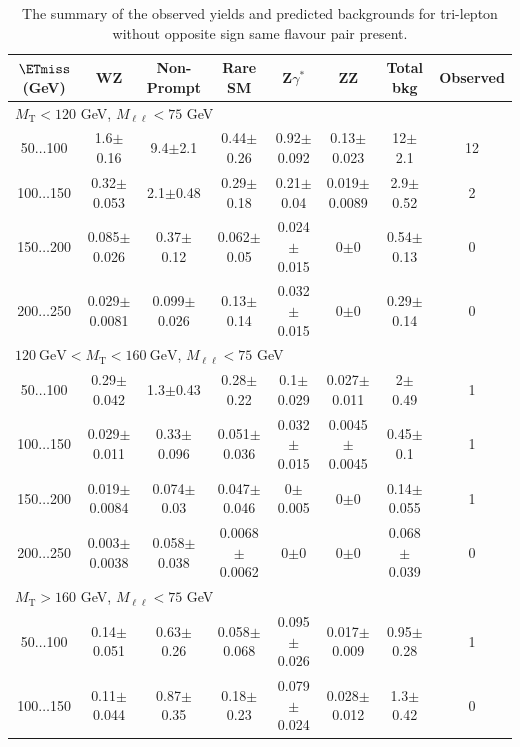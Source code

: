 \begin{landscape}
\begin{table}
\begin{center}
\begin{tabular}{| c | c c c c c c c | }
\hline\hline
\end{tabular}
\end{center}
\end{table}
\begin{table}
\small
\begin{center}
\caption{\label{tab:OSSF0tau0} The summary of the observed yields and predicted backgrounds for tri-lepton without opposite sign same flavour pair present. }
\begin{tabular}{| c | c c c c c c c | }\hline\hline
$\ETmiss$ (GeV) & WZ & Non-Prompt & Rare SM & Z$\gamma^*$ & ZZ & Total bkg & Observed\\\hline\hline
\multicolumn{7}{l}{$M_{\text{T}} < 120$ GeV, $M_{\ell\ell} < 75$ GeV}\\\hline\hline
50$\dots$100&1.6$\pm$0.16&9.4$\pm$2.1&0.44$\pm$0.26&0.92$\pm$0.092&0.13$\pm$0.023&12$\pm$2.1&12\\
100$\dots$150&0.32$\pm$0.053&2.1$\pm$0.48&0.29$\pm$0.18&0.21$\pm$0.04&0.019$\pm$0.0089&2.9$\pm$0.52&2\\
150$\dots$200&0.085$\pm$0.026&0.37$\pm$0.12&0.062$\pm$0.05&0.024$\pm$0.015&0$\pm$0&0.54$\pm$0.13&0\\
200$\dots$250&0.029$\pm$0.0081&0.099$\pm$0.026&0.13$\pm$0.14&0.032$\pm$0.015&0$\pm$0&0.29$\pm$0.14&0\\
\hline\hline
\multicolumn{7}{l}{$120~\mathrm{GeV} < M_{\text{T}} < 160~\mathrm{GeV}$, $M_{\ell\ell} < 75$ GeV}\\\hline\hline
50$\dots$100&0.29$\pm$0.042&1.3$\pm$0.43&0.28$\pm$0.22&0.1$\pm$0.029&0.027$\pm$0.011&2$\pm$0.49&1\\
100$\dots$150&0.029$\pm$0.011&0.33$\pm$0.096&0.051$\pm$0.036&0.032$\pm$0.015&0.0045$\pm$0.0045&0.45$\pm$0.1&1\\
150$\dots$200&0.019$\pm$0.0084&0.074$\pm$0.03&0.047$\pm$0.046&0$\pm$0.005&0$\pm$0&0.14$\pm$0.055&1\\
200$\dots$250&0.003$\pm$0.0038&0.058$\pm$0.038&0.0068$\pm$0.0062&0$\pm$0&0$\pm$0&0.068$\pm$0.039&0\\
\hline\hline
\multicolumn{7}{l}{$M_{\text{T}} > 160$ GeV, $M_{\ell\ell} < 75$ GeV}\\\hline\hline
50$\dots$100&0.14$\pm$0.051&0.63$\pm$0.26&0.058$\pm$0.068&0.095$\pm$0.026&0.017$\pm$0.009&0.95$\pm$0.28&1\\
100$\dots$150&0.11$\pm$0.044&0.87$\pm$0.35&0.18$\pm$0.23&0.079$\pm$0.024&0.028$\pm$0.012&1.3$\pm$0.42&0\\

\end{tabular}
\end{center}
\end{table}
\end{landscape}
